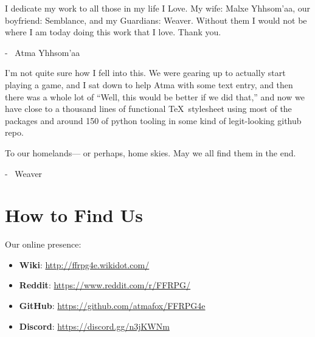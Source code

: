 \begin{multicols}{2}
I dedicate my work to all those in my life I Love.  My wife: Malxe Yhhsom'aa, our boyfriend: Semblance, and my Guardians: Weaver.  Without them I would not be where I am today doing this work that I love.  Thank you. \pc%

- {\ferrum\ Atma Yhhsom'aa}\pw%

I'm not quite sure how I fell into this. We were gearing up to actually start playing a game, and I sat down to help Atma with some text entry, and then there was a whole lot of “Well, this would be better if we did that,” and now we have close to a thousand lines of functional \TeX\ stylesheet using most of the packages and around 150 of python tooling in some kind of legit-looking github repo.\pc%

To our homelands--- or perhaps, home skies. May we all find them in the end.\pc%

- {\ferrum\ Weaver}%

\section{How to Find Us}\label{sec:forward-findus}

Our online presence:%
\begin{itemize}
    \item \textbf{Wiki}: \url{http://ffrpg4e.wikidot.com/}
    \item \textbf{Reddit}: \url{https://www.reddit.com/r/FFRPG/}
    \item \textbf{GitHub}: \url{https://github.com/atmafox/FFRPG4e}
    \item \textbf{Discord}: \url{https://discord.gg/n3jKWNm}
\end{itemize}
\end{multicols}